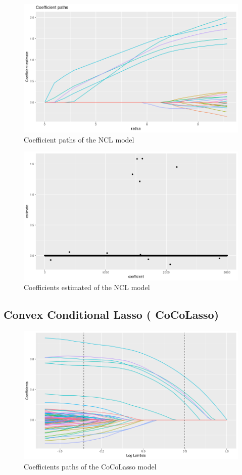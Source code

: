 \documentclass{report}
\begin{document}
\begin{figure}[H]
	\centering
		\includegraphics[scale=0.5]{pictures/pcl.png}
	\caption{Coefficient paths of the NCL model}
	\label{t9}
\end{figure}

\begin{figure}[H]
	\centering
		\includegraphics[scale=0.5]{pictures/cecl.png}
	\caption{Coefficients estimated of the NCL model}
	\label{t10}
\end{figure}

\subsection*{Convex Conditional Lasso ( CoCoLasso)}
\begin{figure}[H]
	\centering
		\includegraphics[scale=0.5]{pictures/pcocol.png}
	\caption{Coefficients paths of the CoCoLasso model}
	\label{t11}
\end{figure}
\end{document}
